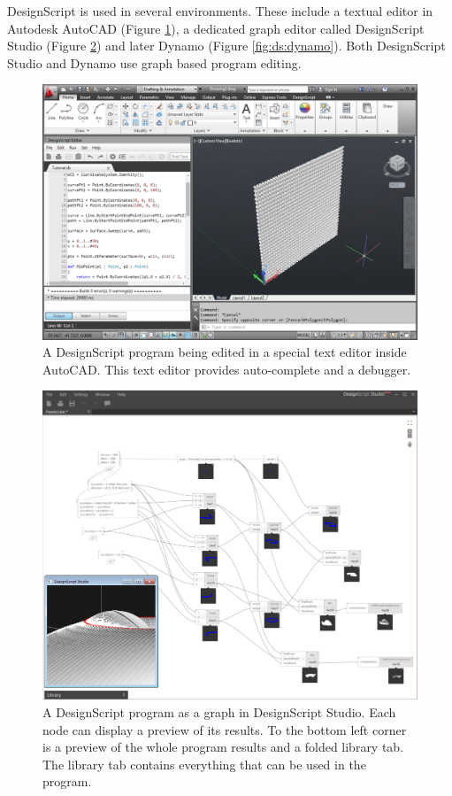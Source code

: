 \documentclass{./llncs2e/llncs}
\begin{document}
	DesignScript is used in several environments. 
	These include a textual editor in Autodesk AutoCAD (Figure \ref{fig:ds:autocad}), a dedicated graph editor called DesignScript Studio (Figure \ref{fig:ds:dsstudio}) and later Dynamo (Figure \ref{fig:ds:dynamo}). 
	Both DesignScript Studio and Dynamo use graph based program editing.

	\begin{figure}
	  \centering
	  \includegraphics[width=1.0\textwidth]{img/ds_autocad}
	    \caption{A DesignScript program being edited in a special text editor inside AutoCAD. This text editor provides auto-complete and a debugger.}
	  \label{fig:ds:autocad}
	\end{figure} 

	\begin{figure}
	  \centering
	  \includegraphics[width=1.0\textwidth]{img/ds_dsstudio}
	    \caption{A DesignScript program as a graph in DesignScript Studio. Each node can display a preview of its results. To the bottom left corner is a preview of the whole program results and a folded library tab. The library tab contains everything that can be used in the program.}
	  \label{fig:ds:dsstudio}
	\end{figure} 
\end{document}
